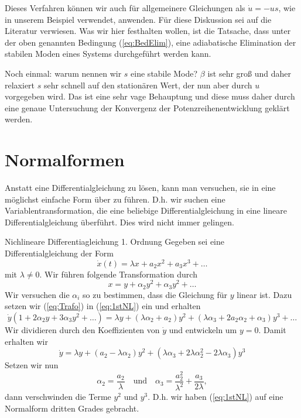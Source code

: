 Dieses Verfahren können wir auch für allgemeinere Gleichungen als $\dot u=-us$,
wie in unserem Beispiel verwendet, anwenden. Für diese Diskussion sei auf die
Literatur verwiesen. Was wir hier festhalten wollen, ist die Tatsache, dass
unter der oben genannten Bedingung (\ref{eq:BedElim}), eine adiabatische
Elimination der stabilen Moden eines Systems durchgeführt werden kann. 

Noch einmal: warum nennen wir $s$ eine stabile Mode? $\beta$ ist sehr groß und
daher relaxiert $s$ sehr schnell auf den stationären Wert, der nun aber durch
$u$ vorgegeben wird. Das ist eine sehr vage Behauptung und diese muss daher
durch eine genaue Untersuchung der Konvergenz der Potenzreihenentwicklung
geklärt werden.
\section{Normalformen}
Anstatt eine Differentialgleichung zu lösen, kann man versuchen, sie in eine möglichst einfache Form über zu führen. D.h. wir suchen eine Variablentransformation, die eine beliebige Differentialgleichung in eine lineare Differentialgleichung überführt. Dies wird nicht immer gelingen.
\begin{example}{Nichlineare Differentiagleichung 1. Ordnung}
  Gegeben sei eine Differentialgleichung der Form
  \begin{equation}\label{eq:1stNL}
  \dot{x}(t)=\lambda x + a_2x^2+a_3x^3+\dots
  \end{equation}
  mit $\lambda\ne 0$. Wir führen folgende Transformation durch
  \begin{equation}\label{eq:Trafo}
  x=y+\alpha_2y^2+\alpha_3y^2+\dots
  \end{equation}
  Wir versuchen die $\alpha_i$ so zu bestimmen, dass die Gleichung für $y$ linear ist. Dazu setzen wir (\ref{eq:Trafo}) in (\ref{eq:1stNL}) ein und erhalten
  \[
  \dot{y}(1+2\alpha_2y+3\alpha_3y^2+\dots)=
  \lambda y+(\lambda\alpha_2+a_2)y^2
  +(\lambda\alpha_3+2a_2\alpha_2+\alpha_3)y^3
  +\dots
  \]
  Wir dividieren durch den Koeffizienten von $\dot{y}$ und entwickeln um $y=0$. Damit erhalten wir
  \[
  \dot{y}=\lambda y+(a_2-\lambda\alpha_2)y^2
  +(\lambda\alpha_3+2\lambda\alpha_2^2
  -2\lambda\alpha_3)y^3
  \]
  Setzen wir nun
  \[
  \alpha_2=\frac{a_2}{\lambda}
  \quad\text{und}\quad
  \alpha_3=\frac{a_2^2}{\lambda^2}+
  \frac{a_3}{2\lambda},
  \]
  dann verschwinden die Terme $y^2$ und $y^3$. D.h. wir haben (\ref{eq:1stNL}) auf eine Normalform dritten Grades gebracht. 
\end{example}